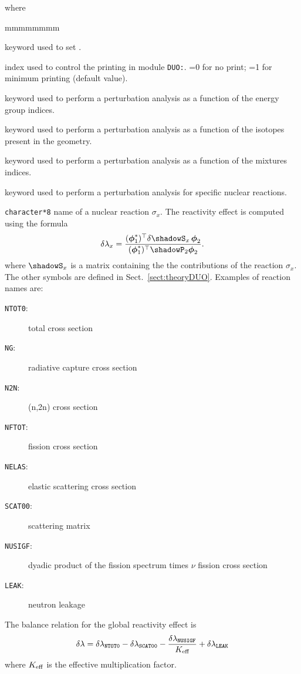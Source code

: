 \noindent where
\begin{ListeDeDescription}{mmmmmmmm}

\item[\moc{EDIT}] keyword used to set .

\item[\dusa{iprint}] index used to control the printing in module {\tt DUO:}. =0 for no print; =1 for minimum printing (default value).

\item[\moc{ENERGY}] keyword used to perform a perturbation analysis as a function of the energy group indices.

\item[\moc{ISOTOPE}] keyword used to perform a perturbation analysis as a function of the isotopes present in the geometry.

\item[\moc{MIXTURE}] keyword used to perform a perturbation analysis as a function of the mixtures indices.

\item[\moc{REAC}] keyword used to perform a perturbation analysis for specific nuclear reactions.

\item[ \dusa{reac}] \texttt{character*8} name of a nuclear reaction $\sigma_x$. The reactivity effect is computed using the formula
\begin{equation}
\delta\lambda_x={(\bff(\phi)^*_1)^\top \delta\shadowS_x \, \bff(\phi)_2\over (\bff(\phi)^*_1)^\top \shadowP_2 \bff(\phi)_2} .
\end{equation}
\noindent where $\shadowS_x$ is a matrix containing the the contributions of the reaction $\sigma_x$. The other symbols
are defined in Sect.~\ref{sect:theoryDUO}. Examples of reaction names are:
\begin{description}
\item[{\tt NTOT0}:] total cross section
\item[{\tt NG}:] radiative capture cross section
\item[{\tt N2N}:] (n,2n) cross section
\item[{\tt NFTOT}:] fission cross section
\item[{\tt NELAS}:] elastic scattering cross section
\item[{\tt SCAT00}:] scattering matrix
\item[{\tt NUSIGF}:] dyadic product of the fission spectrum times $\nu$ fission cross section
\item[{\tt LEAK}:] neutron leakage
\end{description}
The balance relation for the global reactivity effect is
\begin{equation}
\delta\lambda=\delta\lambda_{\tt NTOT0}-\delta\lambda_{\tt SCAT00}-{\delta\lambda_{\tt NUSIGF}\over K_{\rm eff}}+\delta\lambda_{\tt LEAK}
\end{equation}
\noindent where $K_{\rm eff}$ is the effective multiplication factor.


\end{ListeDeDescription}

